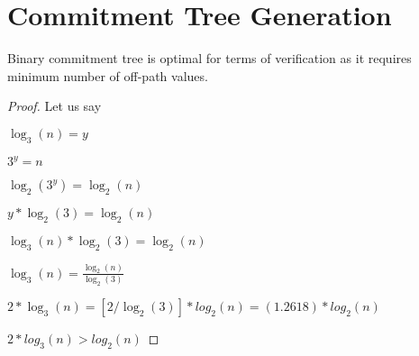 \chapter{Commitment Tree Generation}

\begin{theorem}
\label{Commitment tree}
Binary commitment tree is optimal for terms of verification as it requires minimum number of off-path values.
\end{theorem}

\begin{proof}
Let us say 

$ \log _3( n ) = y $

$ 3^y = n $

$ \log_2( 3^y ) = \log_2( n ) $

$ y * \log_2( 3 ) = \log_2( n ) $

$ \log_3( n )*\log_2( 3 ) = \log_2( n ) $

$ \log_3( n ) = \frac{ {\log _2 ( n )} }{{\log _2 ( 3 )}} $

$ 2 * \log_3( n ) = [2 / \log_2( 3 ) ]* log_2( n ) = ( 1.2618 ) * log_2( n ) $

$ 2 * log_3( n ) > log_2( n ) $  

\end{proof}